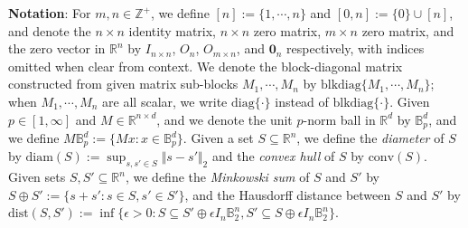 \documentclass[letterpaper, 10 pt, conference]{ieeeconf}
\newcommand{\diag}{\text{diag}}
\newcommand{\blockDiag}{\text{blkdiag}}
\newcommand{\R}{\mathbb{R}}
\newcommand{\?}{\stackrel{?}{=}}
\newcommand{\ballUnit}{\mathbb{B}}
\newcommand{\conv}{\text{conv}}
\newcommand{\diam}{\text{diam}}
\newcommand{\dist}{\text{dist}}
\newcommand{\zero}{\textbf{0}}
\newcommand{\antoine}[1]{{\textcolor[rgb]{1,0,0}{\textsf{[Antoine: {#1}]}}}}
\begin{document}
\textbf{Notation}:
For $m, n \in \mathbb{Z}^+$, we define $[n] := \{1, \cdots, n\}$ and $[0, n] := \{0\} \cup [n]$, and denote the $n \times n$ identity matrix, $n \times n$ zero matrix, $m \times n$ zero matrix, and the zero vector in $\R^n$ by $I_{n \times n}$, $O_n$, $O_{m \times n}$, and $\zero_n$ respectively, with indices omitted when clear from context.
We denote the block-diagonal matrix constructed from given matrix sub-blocks $M_1, \cdots, M_n$ by $\blockDiag\{M_1, \cdots, M_n\}$; when $M_1, \cdots, M_n$ are all scalar, we write $\diag\{\cdot\}$ instead of $\blockDiag\{\cdot\}$.
Given $p \in [1, \infty]$ and $M \in \R^{n \times d}$, and we denote the unit $p$-norm ball in $\R^d$ by $\ballUnit_p^d$, and we define $M \ballUnit_p^d := \{Mx: x \in \ballUnit_p^d \}$.
Given a set $S \subseteq \R^n$, 
we define the \textit{diameter} of $S$ by $\diam(S) := \sup_{s, s' \in S} \Vert s - s'\Vert_2$ and the \textit{convex hull} of $S$ by $\conv(S)$.
Given sets $S, S' \subseteq \R^n$, we define the \textit{Minkowski sum} of $S$ and $S'$ by $S \oplus S' := \{s + s': s \in S, s' \in S' \}$, and the Hausdorff distance between $S$ and $S'$ by $\dist(S, S') := \inf \{ \epsilon > 0: S \subseteq S' \oplus \epsilon I_n \ballUnit_2^n, S' \subseteq S \oplus \epsilon I_n \ballUnit_2^n \}$.


\end{document}
